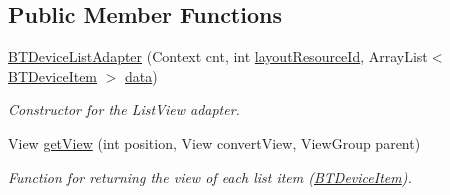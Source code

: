 \subsection*{Public Member Functions}
\begin{DoxyCompactItemize}
\item 
\hyperlink{classcom_1_1jack_1_1motorbikestatistics_1_1_b_t_device_list_adapter_a83121f881d0af42a12c50979f641c77d}{B\+T\+Device\+List\+Adapter} (Context cnt, int \hyperlink{classcom_1_1jack_1_1motorbikestatistics_1_1_b_t_device_list_adapter_a3f7a9f653fb6a0fcda0a0a61e29d0f06}{layout\+Resource\+Id}, Array\+List$<$ \hyperlink{classcom_1_1jack_1_1motorbikestatistics_1_1_b_t_device_item}{B\+T\+Device\+Item} $>$ \hyperlink{classcom_1_1jack_1_1motorbikestatistics_1_1_b_t_device_list_adapter_a7e0dfcd0a703aaecf0c0457515b6984f}{data})
\begin{DoxyCompactList}\small\item\em Constructor for the List\+View adapter. \end{DoxyCompactList}\item 
View \hyperlink{classcom_1_1jack_1_1motorbikestatistics_1_1_b_t_device_list_adapter_ab9e3230f609c8a8195c3e4e9c2b26b2e}{get\+View} (int position, View convert\+View, View\+Group parent)
\begin{DoxyCompactList}\small\item\em Function for returning the view of each list item (\hyperlink{classcom_1_1jack_1_1motorbikestatistics_1_1_b_t_device_item}{B\+T\+Device\+Item}). \end{DoxyCompactList}\end{DoxyCompactItemize}
